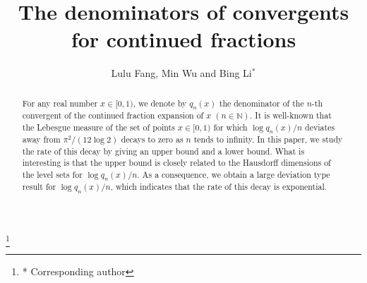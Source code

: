 \documentclass[reqno]{amsart}
\theoremstyle{definition}
\numberwithin{equation}{section}
\begin{document}
\title[The denominators of convergents for continued fractions]{The denominators of convergents for continued fractions}

\author {Lulu Fang, Min Wu and Bing Li$^{*}$}
\address{School of Mathematics, South China University of Technology, Guangzhou 510640, P.R. China}

\thanks {* Corresponding author}

\begin{abstract}
For any real number $x \in [0,1)$, we denote by $q_n(x)$ the denominator of the $n$-th convergent of the continued fraction expansion of $x$ $(n \in \mathbb{N})$.
It is well-known that the Lebesgue measure of the set of points $x \in [0,1)$ for which $\log q_n(x)/n$ deviates away from $\pi^2/(12\log2)$ decays to zero as $n$ tends to infinity.
In this paper, we study the rate of this decay by giving an upper bound and a lower bound. What is interesting is that the upper bound is closely related to the Hausdorff dimensions of the level sets for $\log q_n(x)/n$.
As a consequence, we obtain a large deviation type result for $\log q_n(x)/n$, which indicates that the rate of this decay is exponential.
\end{abstract}

\maketitle
\end{document}

